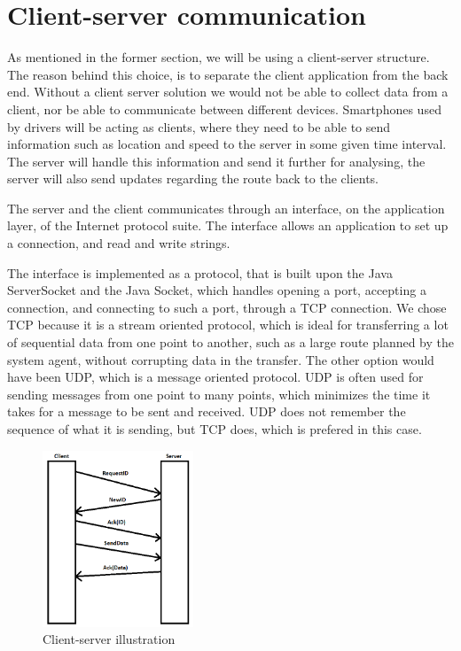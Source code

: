 \section{Client-server communication}
\label{chap:clientserver}
As mentioned in the former section, we will be using a client-server structure.
The reason behind this choice, is to separate the client application from the back end. Without a client server solution we would not be able to collect data from a client, nor be able to communicate between different devices.
Smartphones used by drivers will be acting as clients,
where they need to be able to send information such as location and speed to the server in some given time interval.
The server will handle this information and send it further for analysing, the server will also send updates regarding the route back to the clients.

The server and the client communicates through an interface, on the application layer, of the Internet protocol suite.
The interface allows an application to set up a connection, and read and write strings.

The interface is implemented as a protocol, that is built upon the Java ServerSocket and the Java Socket,
which handles opening a port, accepting a connection, and connecting to such a port, through a TCP connection.
We chose TCP because it is a stream oriented protocol,
which is ideal for transferring a lot of sequential data from one point to another,
such as a large route planned by the system agent, without corrupting data in the transfer.
The other option would have been UDP, which is a message oriented protocol.
UDP is often used for sending messages from one point to many points,
which minimizes the time it takes for a message to be sent and received.
UDP does not remember the sequence of what it is sending, but TCP does, which is prefered in this case.

\begin{figure}[h!]
  \centering
    \includegraphics[width=0.4\textwidth]{figures/clientserver.png}
    \caption{Client-server illustration}
    \label{fig:clientserver}
\end{figure}

